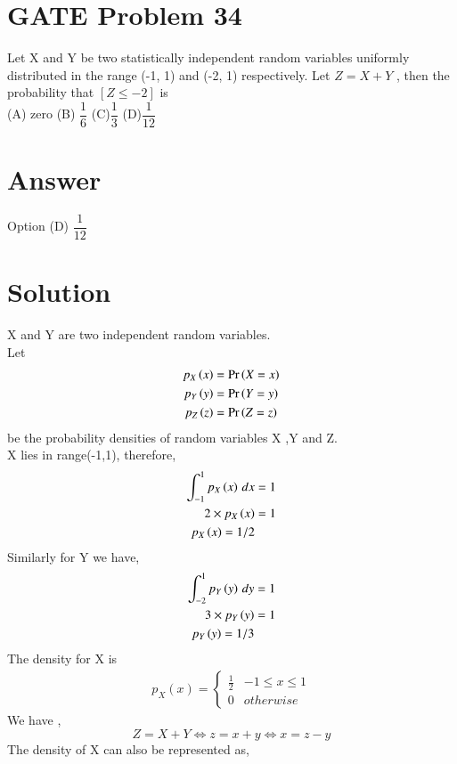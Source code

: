 \documentclass[journal,12pt,twocolumn]{IEEEtran}
\begin{document}
\section*{GATE Problem 34}
Let X and Y be two statistically independent random variables uniformly distributed in the range (-1, 1) and (-2, 1) respectively. Let $Z = X +Y$ , then the probability that $[Z \leq -2]$ is \\
(A) zero         \hfill  (B) $\dfrac{1}{6}$  \hfill
(C)$\dfrac{1}{3}$      \hfill       (D)$\dfrac{1}{12}$  
\section*{Answer}
Option (D) $\dfrac{1}{12}$
\section*{Solution}
X and Y are two independent random variables. \\
Let
\begin{align}
    p_X\left(x\right) &= \Pr\left(X=x\right) \\
    p_Y\left(y\right) &= \Pr\left(Y=y\right)  \\
    p_Z\left(z\right) &= \Pr\left(Z=z\right)
\end{align}
be the probability densities of random variables X ,Y and Z. \\
X lies in range(-1,1), therefore,
\begin{align}
    \int_{-1}^{1} p_X\left(x\right) \,dx  &=1 \\
    2 \times p_X\left(x\right)  &= 1 \\
     p_X\left(x\right) =1 /2
\end{align}
Similarly for Y we have,
\begin{align}
    \int_{-2}^{1} p_Y\left(y\right) \,dy  &=1 \\
    3 \times p_Y\left(y\right)  &= 1  \\
     p_Y\left(y\right) =1 /3
\end{align}
The density for X is \\
\begin{align}
\label{eq:_pdf_x}
p_{X}(x)  = 
\begin{cases}
\frac{1}{2} & -1 \le x \le 1
\\
0 & otherwise
\end{cases}
\end{align}
We have ,
\begin{equation}
    Z= X+Y \iff z= x+ y \iff x = z-y
\end{equation}
The density of X can also be represented as,
\end{document}
